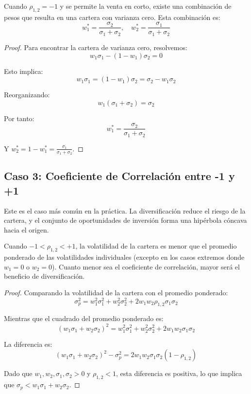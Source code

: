\begin{proposicion}
Cuando $\rho_{1,2} = -1$ y se permite la venta en corto, existe una combinación de pesos que resulta en una cartera con varianza cero. Esta combinación es:
\begin{equation}
w_1^* = \frac{\sigma_2}{\sigma_1 + \sigma_2}, \quad w_2^* = \frac{\sigma_1}{\sigma_1 + \sigma_2}
\end{equation}
\end{proposicion}

\begin{proof}
Para encontrar la cartera de varianza cero, resolvemos:
$$w_1 \sigma_1 - (1 - w_1) \sigma_2 = 0$$

Esto implica:
$$w_1 \sigma_1 = (1 - w_1) \sigma_2 = \sigma_2 - w_1 \sigma_2$$

Reorganizando:
$$w_1 (\sigma_1 + \sigma_2) = \sigma_2$$

Por tanto:
$$w_1^* = \frac{\sigma_2}{\sigma_1 + \sigma_2}$$

Y $w_2^* = 1 - w_1^* = \frac{\sigma_1}{\sigma_1 + \sigma_2}$.
\end{proof}

\subsection{Caso 3: Coeficiente de Correlación entre -1 y +1}

Este es el caso más común en la práctica. La diversificación reduce el riesgo de la cartera, y el conjunto de oportunidades de inversión forma una hipérbola cóncava hacia el origen.

\begin{proposicion}
Cuando $-1 < \rho_{1,2} < +1$, la volatilidad de la cartera es menor que el promedio ponderado de las volatilidades individuales (excepto en los casos extremos donde $w_1 = 0$ o $w_2 = 0$). Cuanto menor sea el coeficiente de correlación, mayor será el beneficio de diversificación.
\end{proposicion}

\begin{proof}
Comparando la volatilidad de la cartera con el promedio ponderado:
$$\sigma_p^2 = w_1^2 \sigma_1^2 + w_2^2 \sigma_2^2 + 2w_1 w_2 \rho_{1,2} \sigma_1 \sigma_2$$

Mientras que el cuadrado del promedio ponderado es:
$$(w_1 \sigma_1 + w_2 \sigma_2)^2 = w_1^2 \sigma_1^2 + w_2^2 \sigma_2^2 + 2w_1 w_2 \sigma_1 \sigma_2$$

La diferencia es:
$$(w_1 \sigma_1 + w_2 \sigma_2)^2 - \sigma_p^2 = 2w_1 w_2 \sigma_1 \sigma_2 (1 - \rho_{1,2})$$

Dado que $w_1, w_2, \sigma_1, \sigma_2 > 0$ y $\rho_{1,2} < 1$, esta diferencia es positiva, lo que implica que $\sigma_p < w_1 \sigma_1 + w_2 \sigma_2$.
\end{proof}


